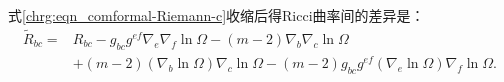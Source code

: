 式\eqref{chrg:eqn_comformal-Riemann-c}收缩后得Ricci曲率间的差异是：
\begin{equation}\label{chrg:eqn_comformal-Ricci}
    \begin{aligned}
        \tilde{R}_{bc}=& R_{bc} - {g}_{bc} {g}^{ef}{\nabla}_{e} {\nabla}_f \ln\Omega
        -(m-2) {\nabla}_{b}  {\nabla}_c \ln \Omega \\
        & + (m-2) ({\nabla}_b \ln\Omega) {\nabla}_{c} \ln\Omega
        - (m-2) {g}_{bc} {g}^{ef}({\nabla}_e \ln\Omega){\nabla}_f \ln\Omega .
    \end{aligned}
\end{equation}
